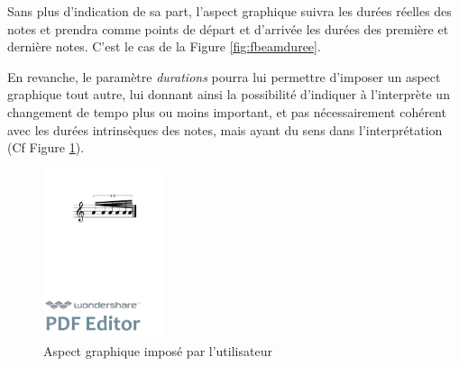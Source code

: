 \documentclass{article}
\newenvironment{gmncode}	{\vspace{-2mm}\small\verbatim}{\endverbatim\vspace{-2mm}}
\begin{document}
Sans plus d'indication de sa part, l'aspect graphique suivra les durées réelles des notes et prendra comme points de départ et d'arrivée les durées des première et dernière notes.  C'est le cas de la Figure \ref{fig:fbeamduree}.

En revanche, le paramètre \emph{durations} pourra lui permettre d'imposer un aspect graphique tout autre, lui donnant ainsi la possibilité d'indiquer à l'interprète un changement de tempo plus ou moins important, et pas nécessairement cohérent avec les durées intrinsèques des notes, mais ayant du sens dans l'interprétation (Cf Figure \ref{fig:utilisateur}).

\begin{figure}[h]
\centering
\begin{gmncode}
[ 
  \fBeam<durations="1/16,1/64", 
  drawDuration="true">
   (a/8 a/16 a a a/32 a) 
]
\end{gmncode}

\includegraphics[width=35mm]{img/durations.pdf}
\caption{Aspect graphique imposé par l'utilisateur}
\label{fig:utilisateur}
\end{figure}
\end{document}
